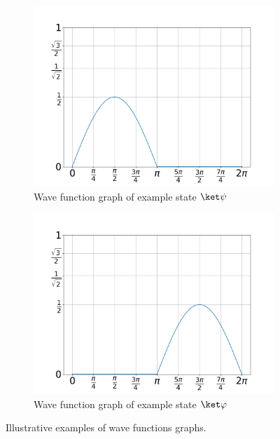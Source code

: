 \begin{figure}[htb]
    \centering
    \begin{subfigure}[b]{0.45\textwidth}
        \includegraphics[width=\textwidth]{img/noson/chapter04/section4_1/psi.png}
        \caption{Wave function graph of example state $\ket \psi$}
        \label{fig:noson-equation-4-5-psi}
    \end{subfigure}
    \begin{subfigure}[b]{0.45\textwidth}
        \includegraphics[width=\textwidth]{img/noson/chapter04/section4_1/phi.png}
        \caption{Wave function graph of example state $\ket \varphi$}
        \label{fig:noson-equation-4-5-phi}
    \end{subfigure}
    \caption{Illustrative examples of wave functions graphs.}
    \label{fig:noson-equation-4-5-psi-and-phi}
\end{figure}

